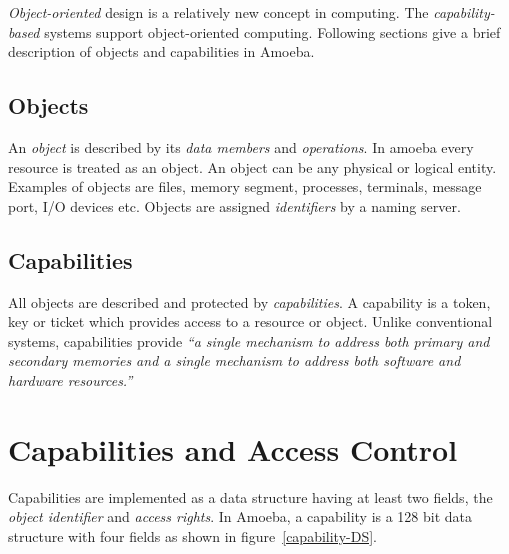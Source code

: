 \documentclass{sig-alternate-10pt}
\begin{document}
\emph{Object-oriented} design is a relatively new concept in computing. The \emph{capability-based} systems support object-oriented computing. Following sections give a brief description of objects and capabilities in Amoeba.

\subsection{Objects}

An \emph{object} is described by its \emph{data members} and \emph{operations}. In amoeba every resource is treated as an object. An object can be any physical or logical entity. Examples of objects are files, memory segment, processes, terminals, message port, I/O devices etc. Objects are assigned \emph{identifiers} by a naming server.

\subsection{Capabilities}

All objects are described and protected by \emph{capabilities}. A capability is a token, key or ticket which provides access to a resource or object. Unlike conventional systems, capabilities provide \emph{``a single mechanism to address both primary and secondary memories and a single mechanism to address both software and hardware resources.''}~\cite[p.~3]{capability-based-systems-levy}

\section{Capabilities and Access Control}

Capabilities are implemented as a data structure having at least two fields, the \emph{object identifier} and \emph{access rights}. In Amoeba, a capability is a 128 bit data structure with four fields as shown in figure~\ref{capability-DS}.
\end{document}
